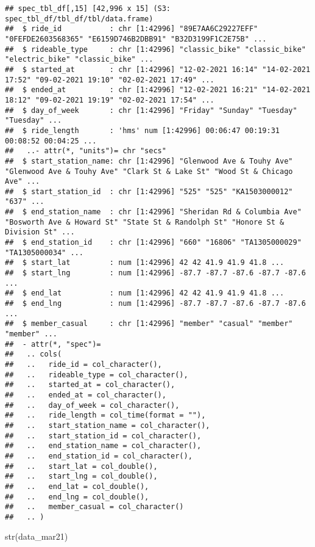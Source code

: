 \documentclass[
]{article}
\newenvironment{Shaded}{\begin{snugshade}}{\end{snugshade}}
\newcommand{\FunctionTok}[1]{\textcolor[rgb]{0.00,0.00,0.00}{#1}}
\newcommand{\NormalTok}[1]{#1}
\begin{document}
\begin{verbatim}
## spec_tbl_df[,15] [42,996 x 15] (S3: spec_tbl_df/tbl_df/tbl/data.frame)
##  $ ride_id           : chr [1:42996] "89E7AA6C29227EFF" "0FEFDE2603568365" "E6159D746B2DBB91" "B32D3199F1C2E75B" ...
##  $ rideable_type     : chr [1:42996] "classic_bike" "classic_bike" "electric_bike" "classic_bike" ...
##  $ started_at        : chr [1:42996] "12-02-2021 16:14" "14-02-2021 17:52" "09-02-2021 19:10" "02-02-2021 17:49" ...
##  $ ended_at          : chr [1:42996] "12-02-2021 16:21" "14-02-2021 18:12" "09-02-2021 19:19" "02-02-2021 17:54" ...
##  $ day_of_week       : chr [1:42996] "Friday" "Sunday" "Tuesday" "Tuesday" ...
##  $ ride_length       : 'hms' num [1:42996] 00:06:47 00:19:31 00:08:52 00:04:25 ...
##   ..- attr(*, "units")= chr "secs"
##  $ start_station_name: chr [1:42996] "Glenwood Ave & Touhy Ave" "Glenwood Ave & Touhy Ave" "Clark St & Lake St" "Wood St & Chicago Ave" ...
##  $ start_station_id  : chr [1:42996] "525" "525" "KA1503000012" "637" ...
##  $ end_station_name  : chr [1:42996] "Sheridan Rd & Columbia Ave" "Bosworth Ave & Howard St" "State St & Randolph St" "Honore St & Division St" ...
##  $ end_station_id    : chr [1:42996] "660" "16806" "TA1305000029" "TA1305000034" ...
##  $ start_lat         : num [1:42996] 42 42 41.9 41.9 41.8 ...
##  $ start_lng         : num [1:42996] -87.7 -87.7 -87.6 -87.7 -87.6 ...
##  $ end_lat           : num [1:42996] 42 42 41.9 41.9 41.8 ...
##  $ end_lng           : num [1:42996] -87.7 -87.7 -87.6 -87.7 -87.6 ...
##  $ member_casual     : chr [1:42996] "member" "casual" "member" "member" ...
##  - attr(*, "spec")=
##   .. cols(
##   ..   ride_id = col_character(),
##   ..   rideable_type = col_character(),
##   ..   started_at = col_character(),
##   ..   ended_at = col_character(),
##   ..   day_of_week = col_character(),
##   ..   ride_length = col_time(format = ""),
##   ..   start_station_name = col_character(),
##   ..   start_station_id = col_character(),
##   ..   end_station_name = col_character(),
##   ..   end_station_id = col_character(),
##   ..   start_lat = col_double(),
##   ..   start_lng = col_double(),
##   ..   end_lat = col_double(),
##   ..   end_lng = col_double(),
##   ..   member_casual = col_character()
##   .. )
\end{verbatim}

\begin{Shaded}
\begin{Highlighting}[]
\FunctionTok{str}\NormalTok{(data\_mar21)}
\end{Highlighting}
\end{Shaded}
\end{document}
